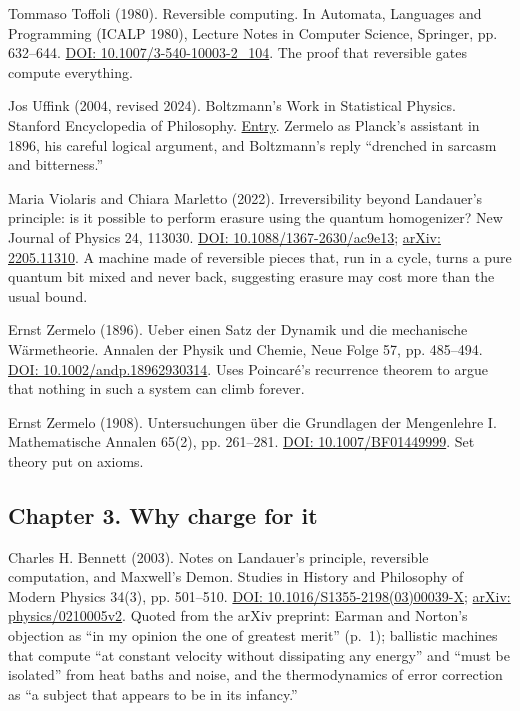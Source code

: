 \documentclass[11pt,twoside]{article}
\theoremstyle{thielethm}
\theoremstyle{thieledef}
\theoremstyle{thieledef}
\theoremstyle{thieledef}
\theoremstyle{thielethm}
\theoremstyle{thieleobs}
\theoremstyle{thielethm}
\begin{document}
\noindent Tommaso Toffoli (1980). Reversible computing. In Automata, Languages and Programming (ICALP 1980), Lecture Notes in Computer Science, Springer, pp. 632--644. \href{https://doi.org/10.1007/3-540-10003-2_104}{DOI: 10.1007/3-540-10003-2\_104}. The proof that reversible gates compute everything.
\par\medskip

\noindent Jos Uffink (2004, revised 2024). Boltzmann's Work in Statistical Physics. Stanford Encyclopedia of Philosophy. \href{https://plato.stanford.edu/entries/statphys-Boltzmann/}{Entry}. Zermelo as Planck's assistant in 1896, his careful logical argument, and Boltzmann's reply ``drenched in sarcasm and bitterness.''
\par\medskip

\noindent Maria Violaris and Chiara Marletto (2022). Irreversibility beyond Landauer's principle: is it possible to perform erasure using the quantum homogenizer? New Journal of Physics 24, 113030. \href{https://doi.org/10.1088/1367-2630/ac9e13}{DOI: 10.1088/1367-2630/ac9e13}; \href{https://arxiv.org/abs/2205.11310}{arXiv: 2205.11310}. A machine made of reversible pieces that, run in a cycle, turns a pure quantum bit mixed and never back, suggesting erasure may cost more than the usual bound.
\par\medskip

\noindent Ernst Zermelo (1896). Ueber einen Satz der Dynamik und die mechanische W\"armetheorie. Annalen der Physik und Chemie, Neue Folge 57, pp. 485--494. \href{https://doi.org/10.1002/andp.18962930314}{DOI: 10.1002/andp.18962930314}. Uses Poincar\'e's recurrence theorem to argue that nothing in such a system can climb forever.
\par\medskip

\noindent Ernst Zermelo (1908). Untersuchungen \"uber die Grundlagen der Mengenlehre I. Mathematische Annalen 65(2), pp. 261--281. \href{https://doi.org/10.1007/BF01449999}{DOI: 10.1007/BF01449999}. Set theory put on axioms.
\par\medskip

\subsection*{Chapter 3. Why charge for it}

\noindent Charles H. Bennett (2003). Notes on Landauer's principle, reversible computation, and Maxwell's Demon. Studies in History and Philosophy of Modern Physics 34(3), pp. 501--510. \href{https://doi.org/10.1016/S1355-2198(03)00039-X}{DOI: 10.1016/S1355-2198(03)00039-X}; \href{https://arxiv.org/abs/physics/0210005v2}{arXiv: physics/0210005v2}. Quoted from the arXiv preprint: Earman and Norton's objection as ``in my opinion the one of greatest merit'' (p.~1); ballistic machines that compute ``at constant velocity without dissipating any energy'' and ``must be isolated'' from heat baths and noise, and the thermodynamics of error correction as ``a subject that appears to be in its infancy.''
\par\medskip
\end{document}
